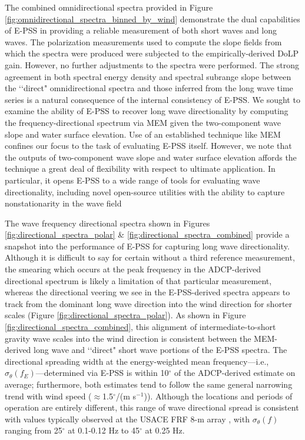 \documentclass[letterpaper,journal]{IEEEtran}
\begin{document}
The combined omnidirectional spectra provided in Figure \ref{fig:omnidirectional_spectra_binned_by_wind} demonstrate the dual capabilities of E-PSS in providing a reliable measurement of both short waves and long waves. The polarization measurements used to compute the slope fields from which the spectra were produced were subjected to the empirically-derived DoLP gain. However, no further adjustments to the spectra were performed. The strong agreement in both spectral energy density and spectral subrange slope between the \lq\lq direct" omnidirectional spectra and those inferred from the long wave time series is a natural consequence of the internal consistency of E-PSS. We sought to examine the ability of E-PSS to recover long wave directionality by computing the frequency-directional spectrum via MEM \cite{lygre_maximum_1986} given the two-component wave slope and water surface elevation. Use of an established technique like MEM confines our focus to the task of evaluating E-PSS itself. However, we note that the outputs of two-component wave slope and water surface elevation affords the technique a great deal of flexibility with respect to ultimate application. In particular, it opens E-PSS to a wide range of tools for evaluating wave directionality, including novel open-source utilities with the ability to capture nonstationarity in the wave field \cite{pelaez-zapata_ocean_2024,pelaez-zapata_ewdm_2025}

The wave frequency directional spectra shown in Figures \ref{fig:directional_spectra_polar} \& \ref{fig:directional_spectra_combined} provide a snapshot into the performance of E-PSS for capturing long wave directionality. Although it is difficult to say for certain without a third reference measurement, the smearing which occurs at the peak frequency in the ADCP-derived directional spectrum is likely a limitation of that particular measurement, whereas the directional veering we see in the E-PSS-derived spectra appears to track from the dominant long wave direction into the wind direction for shorter scales (Figure \ref{fig:directional_spectra_polar}). As shown in Figure \ref{fig:directional_spectra_combined}, this alignment of intermediate-to-short gravity wave scales into the wind direction is consistent between the MEM-derived long wave and \lq\lq direct" short wave portions of the E-PSS spectra. The directional spreading width at the energy-weighted mean frequency---i.e., $\sigma_\theta(f_E)$---determined via E-PSS is within 10$^{\circ}$ of the ADCP-derived estimate on average; furthermore, both estimates tend to follow the same general narrowing trend with wind speed ($\approx$1.5$^{\circ}$/(m s$^{-1}$)). Although the locations and periods of operation are entirely different, this range of wave directional spread is consistent with values typically observed at the USACE FRF 8-m array \cite{collins_performance_2024}, with $\sigma_\theta(f)$ ranging from 25$^{\circ}$ at 0.1-0.12 Hz to 45$^{\circ}$ at 0.25 Hz.
\end{document}
